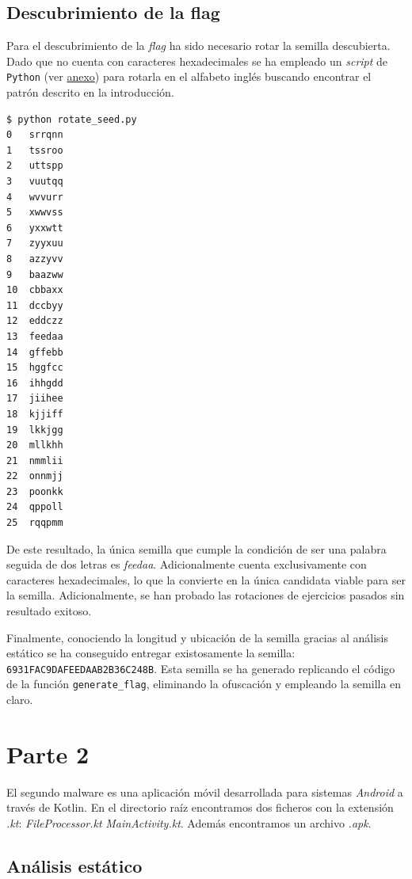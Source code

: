 \documentclass[]{article}
\begin{document}
\subsection{Descubrimiento de la flag}
\label{flag1}

Para el descubrimiento de la \textit{flag} ha sido necesario rotar la semilla
descubierta. Dado que no cuenta con caracteres hexadecimales se ha empleado un
\textit{script} de \texttt{Python} (ver \hyperref[anexo]{anexo}) para rotarla en el alfabeto inglés buscando
encontrar el patrón descrito en la introducción.

\begin{lstlisting}[caption=Resultado de rotar la semilla en el alfabeto inglés]
$ python rotate_seed.py 
0	srrqnn
1	tssroo
2	uttspp
3	vuutqq
4	wvvurr
5	xwwvss
6	yxxwtt
7	zyyxuu
8	azzyvv
9	baazww
10	cbbaxx
11	dccbyy
12	eddczz
13	feedaa
14	gffebb
15	hggfcc
16	ihhgdd
17	jiihee
18	kjjiff
19	lkkjgg
20	mllkhh
21	nmmlii
22	onnmjj
23	poonkk
24	qppoll
25	rqqpmm
\end{lstlisting}

De este resultado, la única semilla que cumple la condición de ser una palabra
seguida de dos letras es \textit{feedaa}. Adicionalmente cuenta exclusivamente
con caracteres hexadecimales, lo que la convierte en
la única candidata viable para ser la semilla. Adicionalmente, se han
probado las rotaciones de ejercicios pasados sin resultado exitoso.

Finalmente, conociendo la longitud y ubicación de la semilla gracias al
análisis estático se ha conseguido entregar existosamente la semilla:
\texttt{6931FAC9DAFEEDAAB2B36C248B}. Esta semilla se ha generado replicando el
código de la función \texttt{generate\_flag}, eliminando la ofuscación y
empleando la semilla en claro.

\section{Parte 2}
\label{sec:type2}

El segundo malware es una aplicación móvil desarrollada para sistemas \textit{Android} a
través de Kotlin. En el directorio raíz encontramos dos ficheros con la
extensión \textit{.kt}: \textit{FileProcessor.kt} \textit{MainActivity.kt}.
Además encontramos un archivo \textit{.apk}.

\subsection{Análisis estático}
\label{subsec:analisis-estatico-2}
\end{document}
